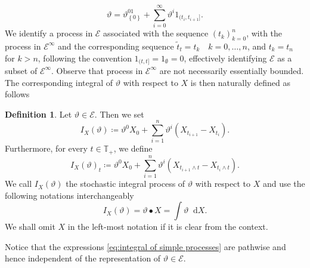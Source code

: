 \documentclass[11pt,a4paper,twoside,openany]{report}
\newcommand{\diff}{\mathop{}\!\mathrm{d}}
\theoremstyle{plain} %
\theoremstyle{definition} %
\newtheorem{definition}[definition]{Definition}
\theoremstyle{remark} %
\begin{document}
\begin{equation}
      \vartheta = \vartheta^01_{\left\{0\right\}}+\sum_{i= 0}^\infty \vartheta^i1_{(t_i,t_{i+1}]}.
\end{equation}
We identify a process in \(\mathcal{E}\) associated with the sequence \((t_k)_{k=0}^n\), with the process in \(\mathcal{E}^{\infty}\) and the corresponding sequence \(\tilde{t}_t=t_k\quad k=0,\dots,n\), and \(t_k = t_n\) for \(k>n\), following the convention \(1_{(t,t]}=1_{\emptyset}=0\), effectively identifying \(\mathcal{E}\) as a subset of \(\mathcal{E}^{\infty}\). Observe that process in \(\mathcal{E}^{\infty}\) are not necessarily essentially bounded. 
\bigbreak
The corresponding integral of \(\vartheta\) with respect to \(X\) is then naturally defined as follows
\begin{definition}\label{def:integral of simple processes}
Let \(\vartheta\in\mathcal{E}\). Then we set 
\begin{equation}\label{eq:integral of simple processes}
    I_X(\vartheta)\coloneqq \vartheta^0X_0+\sum_{i=1}^n \vartheta^i(X_{t_{i+1}}-X_{t_{i}}).
\end{equation}
Furthermore, for every \(t\in\mathbb{T}_+\), we define
    \begin{equation}
        I_X(\vartheta)_t\coloneqq \vartheta^0X_0+\sum_{i=1}^n \vartheta^i(X_{t_{i+1}\wedge t}-X_{t_{i}\wedge t}).
    \end{equation}
    We call \(I_X(\vartheta)\) the stochastic integral process of \(\vartheta\) with respect to \(X\) and use the following notations interchangeably
    \begin{equation}
        I_X(\vartheta)=\vartheta\bullet X=\int \vartheta\diff X.
    \end{equation}
    We shall omit \(X\) in the left-most notation if it is clear from the context.
\end{definition}
Notice that the expressions \cref{eq:integral of simple processes} are pathwise and hence independent of the representation of \(\vartheta\in\mathcal{E}\).
\end{document}
